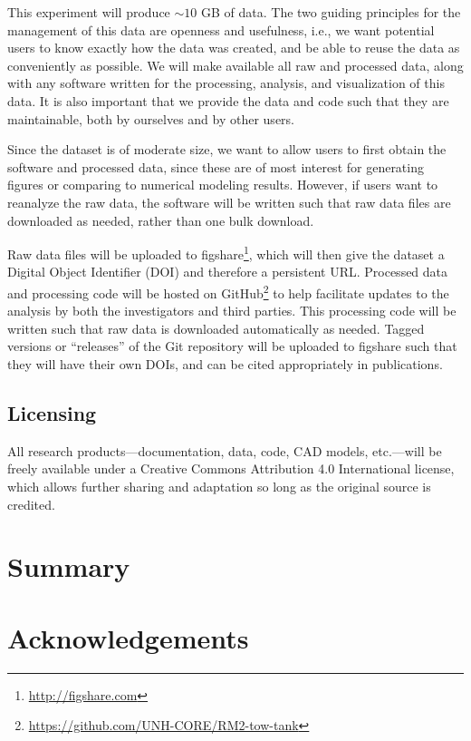 \documentclass[12pt,letterpaper]{scrreprt}
\begin{document}
This experiment will produce $\sim 10$ GB of data. The two guiding principles
for the management of this data are openness and usefulness, i.e., we want
potential users to know exactly how the data was created, and be able to reuse
the data as conveniently as possible. We will make available all raw and
processed data, along with any software written for the processing, analysis,
and visualization of this data. It is also important that we provide the data
and code such that they are maintainable, both by ourselves and by other users.

Since the dataset is of moderate size, we want to allow users to first
obtain the software and processed data, since these are of most interest for
generating figures or comparing to numerical modeling results. However, if users
want to reanalyze the raw data, the software will be written such that raw data
files are downloaded as needed, rather than one bulk download.

Raw data files will be uploaded to figshare\footnote{\url{http://figshare.com}},
which will then give the dataset a Digital Object Identifier (DOI) and therefore
a persistent URL. Processed data and processing code will be hosted on
GitHub\footnote{\url{https://github.com/UNH-CORE/RM2-tow-tank}} to help
facilitate updates to the analysis by both the investigators and third parties.
This processing code will be written such that raw data is downloaded
automatically as needed. Tagged versions or ``releases'' of the Git repository
will be uploaded to figshare such that they will have their own DOIs, and can be
cited appropriately in publications.

\section{Licensing} 

All research products---documentation, data, code, CAD models, etc.---will be
freely available under a Creative Commons Attribution 4.0 International license,
which allows further sharing and adaptation so long as the original source is
credited.


\chapter{Summary}



\chapter{Acknowledgements}
\end{document}
